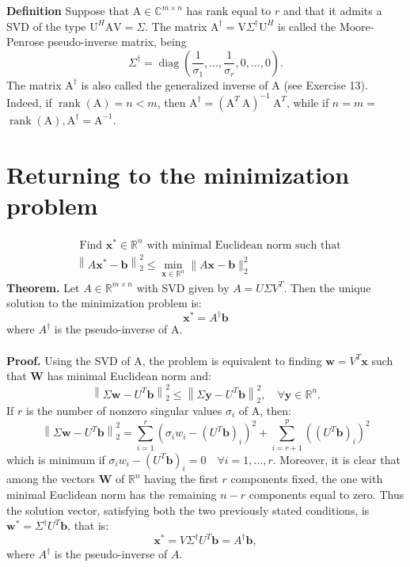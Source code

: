 \documentclass[11pt]{book}
\begin{document}
\textbf{Definition} Suppose that $\mathrm{A} \in \mathbb{C}^{m \times n}$ has rank equal to $r$ and that it admits a SVD of the type $\mathrm{U}^H \mathrm{AV}=\Sigma$. The matrix $\mathrm{A}^{\dagger}=\mathrm{V} \Sigma^{\dagger} \mathrm{U}^H$ is called the Moore-Penrose pseudo-inverse matrix, being
$$
\Sigma^{\dagger}=\operatorname{diag}\left(\frac{1}{\sigma_1}, \ldots, \frac{1}{\sigma_r}, 0, \ldots, 0\right) .
$$
The matrix $\mathrm{A}^{\dagger}$ is also called the generalized inverse of $\mathrm{A}$ (see Exercise 13). Indeed, if $\operatorname{rank}(\mathrm{A})=n<m$, then $\mathrm{A}^{\dagger}=\left(\mathrm{A}^T \mathrm{~A}\right)^{-1} \mathrm{~A}^T$, while if $n=m=$ $\operatorname{rank}(\mathrm{A}), \mathrm{A}^{\dagger}=\mathrm{A}^{-1}$. 
\section*{Returning to the minimization problem}
$$
\boxed{
\begin{aligned}
& \text { Find } \mathbf{x}^{*} \in \mathbb{R}^{n} \text { with minimal Euclidean norm such that } \\
& \left\|A \mathbf{x}^{*}-\mathbf{b}\right\|_{2}^{2} \leq \min _{\mathbf{x} \in \mathbb{R}^{n}}\|A \mathbf{x}-\mathbf{b}\|_{2}^{2}
\end{aligned}
}
$$
\textbf{Theorem.} Let $A \in \mathbb{R}^{m \times n}$ with SVD given by $A=U \Sigma V^{T}$. Then the unique solution to the minimization problem is:
$$
\mathbf{x}^{*}=A^{\dagger} \mathbf{b}
$$
where $A^{\dagger}$ is the pseudo-inverse of $\mathrm{A}$.\\ \\
\textbf{Proof.} Using the SVD of A, the problem is equivalent to finding $\mathbf{w}=V^{T} \mathbf{x}$ such that $\mathbf{W}$ has minimal Euclidean norm and:
$$
\left\|\Sigma \mathbf{w}-U^{T} \mathbf{b}\right\|_{2}^{2} \leq\left\|\Sigma \mathbf{y}-U^{T} \mathbf{b}\right\|_{2}^{2}, \quad \forall \mathbf{y} \in \mathbb{R}^{n} .
$$
If $r$ is the number of nonzero singular values $\sigma_{i}$ of $\mathrm{A}$, then:
$$
\left\|\Sigma \mathbf{w}-U^{T} \mathbf{b}\right\|_{2}^{2}=\sum_{i=1}^{r}\left(\sigma_{i} w_{i}-\left(U^{T} \mathbf{b}\right)_{i}\right)^{2}+\sum_{i=r+1}^{p}\left(\left(U^{T} \mathbf{b}\right)_{i}\right)^{2}
$$
which is minimum if $\sigma_{i} w_{i}-\left(U^{T} \mathbf{b}\right)_{i}=0 \quad \forall i=1, \ldots, r$. Moreover, it is clear that among the vectors $\mathbf{W}$ of $\mathbb{R}^{n}$ having the first $r$ components fixed, the one with minimal Euclidean norm has the remaining $n-r$ components equal to zero. Thus the solution vector, satisfying both the two previously stated conditions, is $\mathbf{w}^{*}=\Sigma^{\dagger} U^{T} \mathbf{b}$, that is:
$$
\mathbf{x}^{*}=V \Sigma^{\dagger} U^{T} \mathbf{b}=A^{\dagger} \mathbf{b},
$$
where $A^{\dagger}$ is the pseudo-inverse of $A$.
\end{document}
